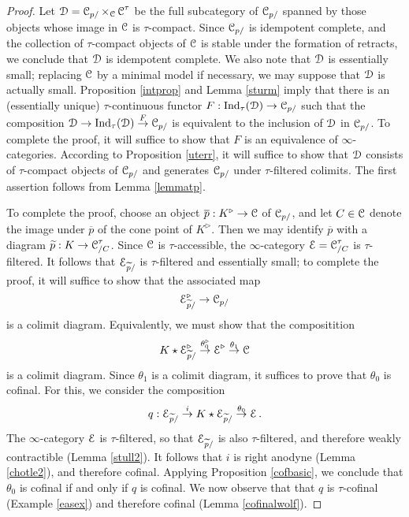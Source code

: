\begin{proof}
Let $\operatorname{\mathcal{D}} = \operatorname{\mathcal{C}}_{p/} \times_{\operatorname{\mathcal{C}}} \operatorname{\mathcal{C}}^{\tau}$ be the full subcategory of
$\operatorname{\mathcal{C}}_{p/}$ spanned by those objects whose image in $\operatorname{\mathcal{C}}$ is $\tau$-compact.
Since $\operatorname{\mathcal{C}}_{p/}$ is idempotent complete, and the collection of $\tau$-compact objects
of $\operatorname{\mathcal{C}}$ is stable under the formation of retracts, we conclude that $\operatorname{\mathcal{D}}$ is idempotent complete. We also note that $\operatorname{\mathcal{D}}$ is essentially small; replacing $\operatorname{\mathcal{C}}$ by a minimal model if necessary, we may suppose that $\operatorname{\mathcal{D}}$ is actually small. Proposition \ref{intprop} and
Lemma \ref{sturm} imply that there is an (essentially unique) $\tau$-continuous functor
$F: \operatorname{Ind}_{\tau}(\operatorname{\mathcal{D}}) \rightarrow \operatorname{\mathcal{C}}_{p/}$ such that the composition
$\operatorname{\mathcal{D}} \rightarrow \operatorname{Ind}_{\tau}(\operatorname{\mathcal{D}}) \stackrel{F}{\rightarrow} \operatorname{\mathcal{C}}_{p/}$ is equivalent to the inclusion of $\operatorname{\mathcal{D}}$ in $\operatorname{\mathcal{C}}_{p/}$. To complete the proof, it will suffice to show that
$F$ is an equivalence of $\infty$-categories. According to Proposition \ref{uterr}, it will suffice to show that $\operatorname{\mathcal{D}}$ consists of $\tau$-compact objects of $\operatorname{\mathcal{C}}_{p/}$ and generates
$\operatorname{\mathcal{C}}_{p/}$ under $\tau$-filtered colimits. The first assertion follows from Lemma \ref{lemmatp}. 

To complete the proof, choose an object $\overline{p}: K^{\triangleright} \rightarrow \operatorname{\mathcal{C}}$ of
$\operatorname{\mathcal{C}}_{p/}$, and let $C \in \operatorname{\mathcal{C}}$ denote the image under $\overline{p}$ of the cone point
of $K^{\triangleright}$. Then we may identify $\overline{p}$ with a diagram
$\widetilde{p}: K \rightarrow \operatorname{\mathcal{C}}^{\tau}_{/C}$. Since $\operatorname{\mathcal{C}}$ is $\tau$-accessible, the
$\infty$-category $\operatorname{\mathcal{E}} = \operatorname{\mathcal{C}}^{\tau}_{/C}$ is $\tau$-filtered. It follows that
$\operatorname{\mathcal{E}}_{\widetilde{p}/}$ is $\tau$-filtered and essentially small; to complete the proof, it will suffice to show that the associated map
$$ \operatorname{\mathcal{E}}_{\widetilde{p}/}^{\triangleright} \rightarrow \operatorname{\mathcal{C}}_{p/}$$
is a colimit diagram. Equivalently, we must show that the compositition
$$ K \star \operatorname{\mathcal{E}}_{\widetilde{p}/}^{\triangleright} \stackrel{\theta_0^{\triangleright}}{\rightarrow}
\operatorname{\mathcal{E}}^{\triangleright} \stackrel{\theta_1}{\rightarrow} \operatorname{\mathcal{C}}$$
is a colimit diagram. Since $\theta_1$ is a colimit diagram, it suffices to prove that $\theta_0$ is cofinal. For this, we consider the composition
$$ q: \operatorname{\mathcal{E}}_{\widetilde{p}/} \stackrel{i}{\rightarrow} K \star \operatorname{\mathcal{E}}_{\widetilde{p}/} \stackrel{\theta_0}{\rightarrow} \operatorname{\mathcal{E}}.$$
The $\infty$-category $\operatorname{\mathcal{E}}$ is $\tau$-filtered, so that $\operatorname{\mathcal{E}}_{\widetilde{p}/}$ is also
$\tau$-filtered, and therefore weakly contractible (Lemma \ref{stull2}). It follows that 
$i$ is right anodyne (Lemma \ref{chotle2}), and therefore cofinal. Applying Proposition \ref{cofbasic}, we conclude that $\theta_0$ is cofinal if and only if $q$ is cofinal. We now observe that that $q$ is $\tau$-cofinal (Example \ref{easex}) and therefore cofinal (Lemma \ref{cofinalwolf}).
\end{proof}

